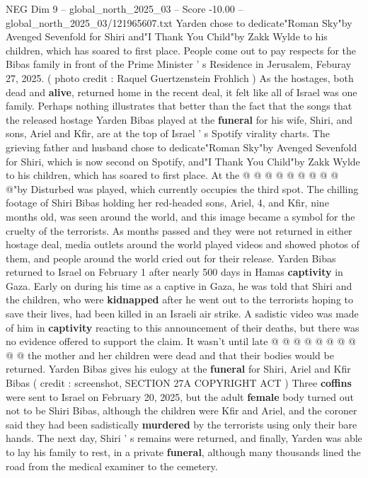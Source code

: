 \begin{textsample}{NEG Dim 9 – global\_north\_2025\_03 – Score -10.00 – global\_north\_2025\_03/121965607.txt}  \label{ex:f9_neg_141}
Yarden chose to dedicate"Roman Sky"by Avenged Sevenfold for Shiri and"I Thank You Child"by Zakk Wylde to his children, which has soared to first place.
People come out to pay respects for the Bibas family in front of the Prime Minister ' s Residence in Jerusalem, Feburay 27, 2025. ( photo credit : Raquel Guertzenstein Frohlich ) As the hostages, both dead and \textbf{alive}, returned home in the recent deal, it felt like all of Israel was one family.
Perhaps nothing illustrates that better than the fact that the songs that the released hostage Yarden Bibas played at the \textbf{funeral} for his wife, Shiri, and sons, Ariel and Kfir, are at the top of Israel ' s Spotify virality charts.
The grieving father and husband chose to dedicate"Roman Sky"by Avenged Sevenfold for Shiri, which is now second on Spotify, and"I Thank You Child"by Zakk Wylde to his children, which has soared to first place.
At the @ @ @ @ @ @ @ @ @ @"by Disturbed was played, which currently occupies the third spot.
The chilling footage of Shiri Bibas holding her red-headed sons, Ariel, 4, and Kfir, nine months old, was seen around the world, and this image became a symbol for the cruelty of the terrorists.
As months passed and they were not returned in either hostage deal, media outlets around the world played videos and showed photos of them, and people around the world cried out for their release.
Yarden Bibas returned to Israel on February 1 after nearly 500 days in Hamas \textbf{captivity} in Gaza.
Early on during his time as a captive in Gaza, he was told that Shiri and the children, who were \textbf{kidnapped} after he went out to the terrorists hoping to save their lives, had been killed in an Israeli air strike.
A sadistic video was made of him in \textbf{captivity} reacting to this announcement of their deaths, but there was no evidence offered to support the claim.
It wasn't until late @ @ @ @ @ @ @ @ @ @ the mother and her children were dead and that their bodies would be returned.
Yarden Bibas gives his eulogy at the \textbf{funeral} for Shiri, Ariel and Kfir Bibas ( credit : screenshot, SECTION 27A COPYRIGHT ACT ) Three \textbf{coffins} were sent to Israel on February 20, 2025, but the adult \textbf{female} body turned out not to be Shiri Bibas, although the children were Kfir and Ariel, and the coroner said they had been sadistically \textbf{murdered} by the terrorists using only their bare hands.
The next day, Shiri ' s remains were returned, and finally, Yarden was able to lay his family to rest, in a private \textbf{funeral}, although many thousands lined the road from the medical examiner to the cemetery.

\end{textsample}
